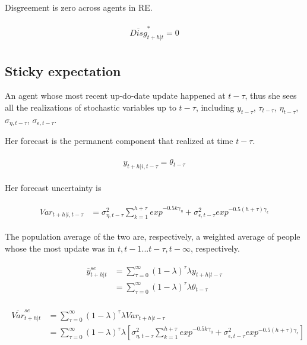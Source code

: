 \documentclass[]{article}
\begin{document}
Disgreement is zero across agents in RE.


\begin{eqnarray}
\begin{split}
\overline{Disg}^*_{t+h|t} =  0 
\end{split} 
\end{eqnarray}

\subsection{Sticky expectation}

An agent whose most recent up-do-date update happened at $t-\tau$, thus she sees all the realizations of stochastic variables up to $t-\tau$, including $y_{t-\tau}$, $\tau_{t-\tau}$, $\eta_{t-\tau}$, $\sigma_{\eta,t-\tau}$, $\sigma_{\epsilon,t-\tau}$. 

Her forecast is the permanent component that realized at time $t-\tau$. 

\begin{eqnarray}
\begin{split}
y_{t+h|i,t-\tau}  = \theta_{t-\tau} 
\end{split}
\end{eqnarray}

Her forecast uncertainty is 


\begin{eqnarray}
\begin{split}
Var_{t+h|i,t-\tau} & = \sigma^2_{\eta,t-\tau} \sum^{h+\tau}_{k=1} exp^{- 0.5k\gamma_{\eta}} +  \sigma^2_{\epsilon,t-\tau} exp^{- 0.5(h+\tau)\gamma_{\epsilon}}
\end{split} 
\end{eqnarray}

The population average of the two are, respectively, a weighted average of people whose the most update was in $t, t-1... t-\tau, t-\infty$, respectively. 


\begin{eqnarray}
\begin{split}
\overline y^{se}_{t+h|t} & = \sum^{\infty}_{\tau=0} (1-\lambda)^\tau\lambda y_{t+h|t-\tau} \\
& = \sum^{\infty}_{\tau=0} (1-\lambda)^\tau\lambda \theta_{t-\tau}
\end{split} 
\end{eqnarray}



\begin{eqnarray}
\begin{split}
\overline {Var}^{se}_{t+h|t} & = \sum^{\infty}_{\tau=0} (1-\lambda)^\tau\lambda Var_{t+h|t-\tau} \\
& = \sum^{\infty}_{\tau=0} (1-\lambda)^\tau\lambda [ \sigma^2_{\eta,t-\tau} \sum^{h+\tau}_{k=1} exp^{- 0.5k\gamma_{\eta}} +  \sigma^2_{\epsilon,t-\tau} exp^{- 0.5(h+\tau)\gamma_{\epsilon}}]
\end{split} 
\end{eqnarray}
\end{document}
